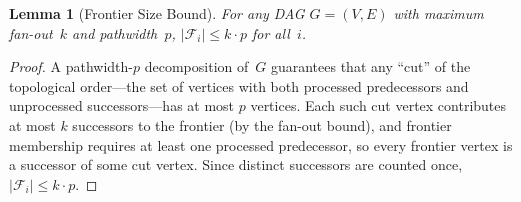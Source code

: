 \documentclass[11pt,a4paper]{article}
\newtheorem{lemma}[theorem]{Lemma}
\theoremstyle{definition}
\begin{document}
\begin{lemma}[Frontier Size Bound]\label{lem:frontier-bound}
For any DAG $G = (V, E)$ with maximum fan-out~$k$ and pathwidth~$p$,
$|\mathcal{F}_i| \leq k \cdot p$ for all~$i$.
\end{lemma}

\begin{proof}
A pathwidth-$p$ decomposition of~$G$ guarantees that any ``cut'' of the
topological order---the set of vertices with both processed predecessors and
unprocessed successors---has at most $p$ vertices.  Each such cut vertex
contributes at most $k$ successors to the frontier (by the fan-out bound),
and frontier membership requires at least one processed predecessor, so
every frontier vertex is a successor of some cut vertex.  Since distinct
successors are counted once, $|\mathcal{F}_i| \leq k \cdot p$.
\end{proof}
\end{document}
